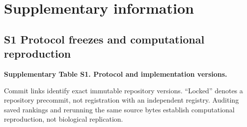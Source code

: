 \documentclass[
  11pt,
]{article}
\begin{document}
\section{Supplementary information}\label{supplementary-information}

\subsection{S1 Protocol freezes and computational
reproduction}\label{s1-protocol-freezes-and-computational-reproduction}

\textbf{Supplementary Table S1. Protocol and implementation versions.}

Commit links identify exact immutable repository versions. ``Locked''
denotes a repository precommit, not registration with an independent
registry. Auditing saved rankings and rerunning the same source bytes
establish computational reproduction, not biological replication.
\end{document}
